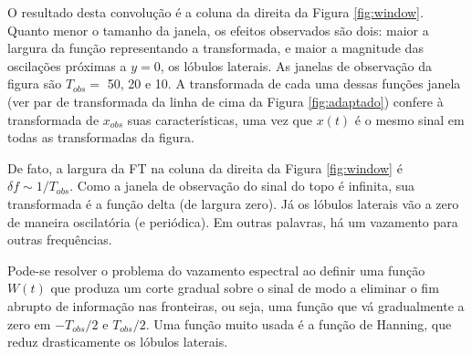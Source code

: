 O resultado desta convolução é a coluna da direita da Figura \ref{fig:window}. Quanto menor o tamanho da janela, os efeitos observados são dois: maior a largura da função representando a transformada, e maior a magnitude das oscilações próximas a $y=0$, os lóbulos laterais. As janelas de observação da figura são $T_{obs} = $ 50, 20 e 10. A transformada de cada uma dessas funções janela (ver par de transformada da linha de cima da Figura \ref{fig:adaptado}) confere à transformada de $x_{obs}$ suas características, uma vez que $x(t)$ é o mesmo sinal em todas as transformadas da figura.

De fato, a largura da FT na coluna da direita da Figura \ref{fig:window} é $\delta f \sim 1/T_{obs}$. Como a janela de observação do sinal do topo é infinita, sua transformada é a função delta (de largura zero). Já os lóbulos laterais vão a zero de maneira oscilatória (e periódica). Em outras palavras, há um vazamento para outras frequências. 

Pode-se resolver o problema do vazamento espectral ao definir uma função $W(t)$ que produza um corte gradual sobre o sinal de modo a eliminar o fim abrupto de informação nas fronteiras, ou seja, uma função que vá gradualmente a zero em $-T_{obs}/2$ e $T_{obs}/2$. Uma função muito usada é a função de Hanning, que reduz drasticamente os lóbulos laterais.



